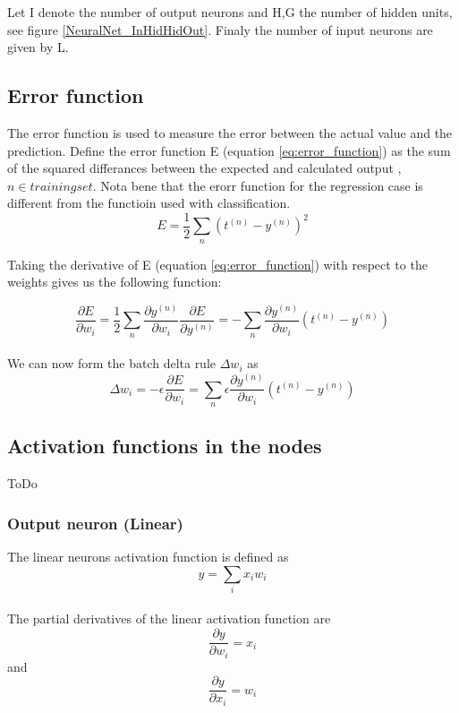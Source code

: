 Let I denote the number of output neurons and H,G the number of hidden units, see figure \ref{NeuralNet_InHidHidOut}. Finaly the number of input neurons are given by L.


\subsection{Error function}
The error function is used to measure the error between the actual value and the prediction. Define the error function E (equation \ref{eq:error_function}) as the sum of the squared differances between the expected and calculated output , $n \in trainingset$. Nota bene that the erorr function for the regression case is different from the functioin used with classification.
\begin{equation} \label{eq:error_function}
E = \frac{1}{2} \sum_{n}{(t^{(n)}-y^{(n)})^{2}}
\end{equation}

Taking the derivative of E (equation \ref{eq:error_function}) with respect to the weights gives us the following function:

\begin{equation} \label{eq:error_function_part_w} 
\frac{\partial{E}}{\partial{w_{i}}} = \frac{1}{2} \sum_{n}{\frac{\partial{y^{(n)}}}{\partial{w_{i}}} \frac{\partial{E}}{\partial{y^{(n)}}}} = -\sum_{n}{\frac{\partial{y^{(n)}}}{\partial{w_{i}}}(t^{(n)}-y^{(n)})}
\end{equation}
\\
We can now form the batch delta rule $\Delta w_{i}$ as
\begin{equation} \label{eq:batch_delta_rule}
\Delta w_{i} = -\epsilon \frac{\partial{E}}{\partial{w_{i}}} = \sum_{n}{\epsilon \frac{\partial{y^{(n)}}}{\partial{w_{i}}}(t^{(n)}-y^{(n)})}
\end{equation}




\subsection{Activation functions in the nodes}
ToDo
\subsubsection{Output neuron (Linear)}
The linear neurons activation function is defined as
\begin{equation} \label{eq:linj_func}
y = \sum_{i}x_{i}w_{i} 
\end{equation} 
\\
The partial derivatives of the linear activation function are
\begin{equation} \label{eq:linear_partial_w}
\frac{\partial{y}}{\partial{w_{i}}} = x_{i}
\end{equation}
and
\begin{equation} \label{eq:linear_partial_x}
\frac{\partial{y}}{\partial{x_{i}}} = w_{i}
\end{equation}

